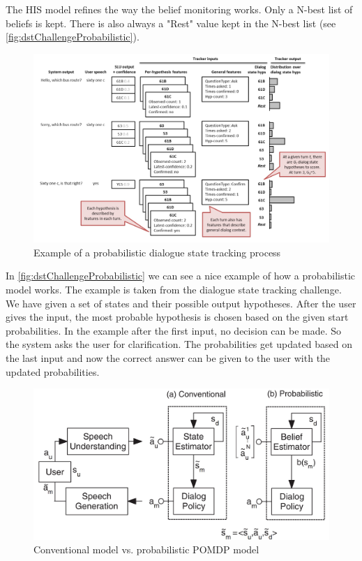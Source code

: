 \documentclass[conference]{IEEEtran}
\begin{document}
The HIS model refines the way the belief monitoring works. Only a N-best list of beliefs is kept. There is also always a "Rest" value kept in the N-best list (see \autoref{fig:dstChallengeProbabilistic})\cite{young2007hidden}.

\begin{figure}[H]
\centering
   \includegraphics[width=\linewidth]{dstChallangeProbabilistic.jpg}
  \caption{Example of a probabilistic dialogue state tracking process\cite{williams2013dialog}}
  \label{fig:dstChallengeProbabilistic}
\end{figure}

In \autoref{fig:dstChallengeProbabilistic} we can see a nice example of how a probabilistic model works. The example is taken from the dialogue state tracking challenge\cite{williams2013dialog}. We have given a set of states and their possible output hypotheses.
After the user gives the input, the most probable hypothesis is chosen based on the given start probabilities. In the example after the first input, no decision can be made. So the system asks the user for clarification. The probabilities get updated based on the last input and now the correct answer can be given to the user with the updated probabilities. 


\begin{figure}[H]
\centering
   \includegraphics[width=\linewidth]{probabilisticVsConventionalModel.jpg}
  \caption{Conventional model vs. probabilistic POMDP model\cite{young2010hidden}}
  \label{fig:pomdpVsConventional}
\end{figure}
\end{document}
